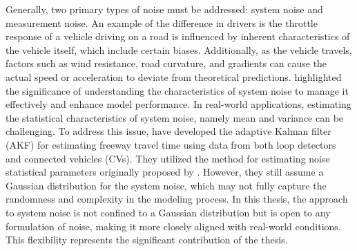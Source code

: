 Generally, two primary types of noise must be addressed: system noise and measurement noise. An example of the difference in drivers is the throttle response of a vehicle driving on a road is influenced by inherent characteristics of the vehicle itself, which include certain biases. Additionally, as the vehicle travels, factors such as wind resistance, road curvature, and gradients can cause the actual speed or acceleration to deviate from theoretical predictions.
\textcite{ajitha2015real} highlighted the significance of understanding the characteristics of system noise to manage it effectively and enhance model performance.  In real-world applications, estimating the statistical characteristics of system noise, namely mean and variance can be challenging. To address this issue, \textcite{chu2005adaptive} have developed the adaptive Kalman filter (AKF) for estimating freeway travel time using data from both loop detectors and connected vehicles (CVs). They utilized the method for estimating noise statistical parameters originally proposed by \textcite{myers1976adaptive}. However, they still assume a Gaussian distribution for the system noise, which may not fully capture the randomness and complexity in the modeling process. In this thesis, the approach to system noise is not confined to a Gaussian distribution but is open to any formulation of noise, making it more closely aligned with real-world conditions. This flexibility represents the significant contribution of the thesis.


